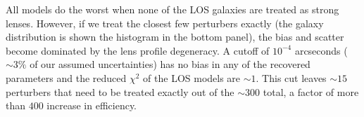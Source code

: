 All models do the worst when none of the LOS galaxies are treated as strong lenses. However, if we treat the closest few perturbers exactly (the galaxy distribution is shown the histogram in the bottom panel), the bias and scatter become dominated by the lens profile degeneracy. A cutoff of $10^{-4}$ arcseconds ($\sim3\%$ of our assumed uncertainties) has no bias in any of the recovered parameters and the reduced $\chi^2$ of the LOS models are $\sim 1$. This cut leaves $\sim 15$ perturbers that need to be treated exactly out of the $\sim 300$ total, a factor of more than $400$ increase in efficiency.
  
  
  
